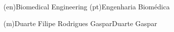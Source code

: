 %
%
%
%
\ntdegreename(en){Biomedical Engineering}          %
\ntdegreename(pt){Engenharia Biomédica} %



%
%
%
%



%
%
\ntauthorname(m){Duarte Filipe Rodrigues Gaspar}{Duarte Gaspar}



